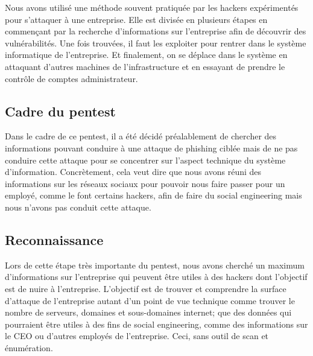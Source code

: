 \documentclass[french,paper=a4,oneside,captions=tableheading]{article}
\begin{document}
Nous avons utilisé une méthode souvent pratiquée par les hackers expérimentés pour s'attaquer à une entreprise. Elle est divisée en plusieurs étapes en commençant par la recherche d'informations sur l'entreprise afin de découvrir des vulnérabilités. Une fois trouvées, il faut les exploiter pour rentrer dans le système informatique de l'entreprise. Et finalement, on se déplace dans le système en attaquant d'autres machines de l'infrastructure et en essayant de prendre le contrôle de comptes administrateur.















\subsection{Cadre du pentest}

Dans le cadre de ce pentest, il a été décidé préalablement de chercher des informations pouvant conduire à une attaque de phishing ciblée mais de ne pas conduire cette attaque pour se concentrer sur l'aspect technique du système d'information. Concrètement, cela veut dire que nous avons réuni des informations sur les réseaux sociaux pour pouvoir nous faire passer pour un employé, comme le font certains hackers, afin de faire du social engineering mais nous n'avons pas conduit cette attaque.










\subsection{Reconnaissance}

Lors de cette étape très importante du pentest, nous avons cherché un maximum d'informations sur l'entreprise qui peuvent être utiles à des hackers dont l'objectif est de nuire à l'entreprise. L'objectif est de trouver et comprendre la surface d'attaque de l'entreprise autant d'un point de vue technique comme trouver le nombre de serveurs, domaines et sous-domaines internet; que des données qui pourraient être utiles à des fins de social engineering, comme des informations sur le CEO ou d'autres employés de l'entreprise. Ceci, sans outil de scan et énumération.
\end{document}
